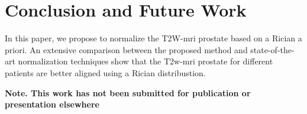 \section{Conclusion and Future Work}
\label{sec:con}
In this paper, we propose to normalize the T2W-\ac{mri} prostate based on a Rician a priori. 
An extensive comparison between the proposed method and state-of-the-art normalization techniques show that the T2w-\ac{mri} prostate for different patients are better aligned using a Rician distribustion.

\textbf{Note. This work has not been submitted for publication or presentation elsewhere}

